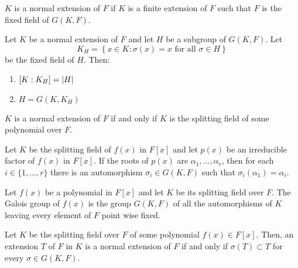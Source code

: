 \begin{definition}\label{def:normal-extension}
	$K$ is a normal extension of $F$ if $K$ is a finite extension of $F$ such that
	$F$ is the fixed field of $G(K,F)$.
\end{definition}

\begin{theorem}\label{thm:on-the-subfield-subgroup-correspondence}
	Let $K$ be a normal extension of $F$ and let $H$ be a subgroup of $G(K,F)$.
	Let
	\[
		K_{H}=\left\{{x}\in{K}:\sigma(x)=x\text{ for all }{\sigma}\in{H}\right\}
	\]
	be the fixed field of $H$. Then:
	\begin{enumerate}
		\item $[K:K_{H}]=\lvert H\rvert$
		\item $H=G(K,K_{H})$
	\end{enumerate}
\end{theorem}

\begin{theorem}\label{thm:a-characterization-of-normality}
	$K$ is a normal extension of $F$ if and only if $K$ is the splitting field of
	some polynomial over $F$.
\end{theorem}

\begin{lemma}\label{lem:the-action-of-the-galois-group-of-a-normal-extension-is-transitive}
	Let $K$ be the splitting field of $f(x)$ in $F[x]$ and let $p(x)$ be an
	irreducible factor of $f(x)$ in $F[x]$. If the roots of $p(x)$ are
	$\alpha_{1},\ldots,\alpha_{r}$, then for each ${i}\in\{1,\ldots,r\}$ there is
	an automorphism ${\sigma_{i}}\in{G(K,F)}$ such that
	$\sigma_{i}(\alpha_{1})=\alpha_{i}$.
\end{lemma}

\begin{definition}\label{def:galois-group}
	Let $f(x)$ be a polynomial in $F[x]$ and let $K$ be its splitting field over
	$F$. The Galois group of $f(x)$ is the group $G(K,F)$ of all the automorphisms
	of $K$ leaving every element of $F$ point wise fixed.
\end{definition}

\begin{lemma}\label{lem:another-characterization-of-normality}
  Let $K$ be the splitting field over $F$ of some polynomial ${f(x)}\in{F[x]}$.
  Then, an extension $T$ of $F$ in $K$ is a normal extension of $F$ if and only
  if $\sigma(T)\subset{T}$ for every ${\sigma}\in{G(K,F)}$.
\end{lemma}

